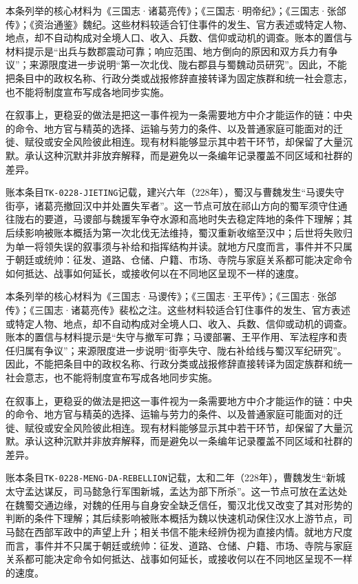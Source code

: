 本条列举的核心材料为《三国志·诸葛亮传》；《三国志·明帝纪》；《三国志·张郃传》；《资治通鉴》魏纪。这些材料较适合钉住事件的发生、官方表述或特定人物、地点，却不自动构成对全境人口、收入、兵数、信仰或动机的调查。账本的置信与材料提示是“出兵与数郡震动可靠；响应范围、地方倒向的原因和双方兵力有争议”；来源限度进一步说明“第一次北伐、陇右郡县与蜀魏动员研究”。因此，不能把条目中的政权名称、行政分类或战报修辞直接转译为固定族群和统一社会意志，也不能将制度宣布写成各地同步实施。

在叙事上，更稳妥的做法是把这一事件视为一条需要地方中介才能运作的链：中央的命令、地方官与精英的选择、运输与劳力的条件、以及普通家庭可能面对的迁徙、赋役或安全风险彼此相连。现有材料能够显示其中若干环节，却保留了大量沉默。承认这种沉默并非放弃解释，而是避免以一条编年记录覆盖不同区域和社群的差异。

账本条目\texttt{TK-0228-JIETING}记载，建兴六年（228年），蜀汉与曹魏发生“马谡失守街亭，诸葛亮撤回汉中并处置失军者”。这一节点可放在祁山方向的蜀军须守住通往陇右的要道，马谡部与魏援军争夺水源和高地时失去稳定阵地的条件下理解；其后续影响被账本概括为第一次北伐无法维持，蜀汉重新收缩至汉中；后世将失败归为单一将领失误的叙事须与补给和指挥结构并读。就地方尺度而言，事件并不只属于朝廷或统帅：征发、道路、仓储、户籍、市场、寺院与家庭关系都可能决定命令如何抵达、战事如何延长，或接收何以在不同地区呈现不一样的速度。

本条列举的核心材料为《三国志·马谡传》；《三国志·王平传》；《三国志·张郃传》；《三国志·诸葛亮传》裴松之注。这些材料较适合钉住事件的发生、官方表述或特定人物、地点，却不自动构成对全境人口、收入、兵数、信仰或动机的调查。账本的置信与材料提示是“失守与撤军可靠；马谡部署、王平作用、军法程序和责任归属有争议”；来源限度进一步说明“街亭失守、陇右补给线与蜀汉军纪研究”。因此，不能把条目中的政权名称、行政分类或战报修辞直接转译为固定族群和统一社会意志，也不能将制度宣布写成各地同步实施。

在叙事上，更稳妥的做法是把这一事件视为一条需要地方中介才能运作的链：中央的命令、地方官与精英的选择、运输与劳力的条件、以及普通家庭可能面对的迁徙、赋役或安全风险彼此相连。现有材料能够显示其中若干环节，却保留了大量沉默。承认这种沉默并非放弃解释，而是避免以一条编年记录覆盖不同区域和社群的差异。

账本条目\texttt{TK-0228-MENG-DA-REBELLION}记载，太和二年（228年），曹魏发生“新城太守孟达谋反，司马懿急行军围新城，孟达为部下所杀”。这一节点可放在孟达处在魏蜀交通边缘，对魏的任用与自身安全缺乏信任，蜀汉北伐又改变了其对形势的判断的条件下理解；其后续影响被账本概括为魏以快速机动保住汉水上游节点，司马懿在西部军政中的声望上升；相关书信不能未经辨伪视为直接内情。就地方尺度而言，事件并不只属于朝廷或统帅：征发、道路、仓储、户籍、市场、寺院与家庭关系都可能决定命令如何抵达、战事如何延长，或接收何以在不同地区呈现不一样的速度。

